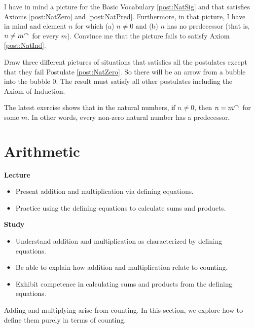 \begin{exer}
\begin{exercise}
\item\label{exer:cases} I have in mind a picture for the Basic Vocabulary \ref{post:NatSig} and that satisfies Axioms \ref{post:NatZero}
and \ref{post:NatPred}. Furthermore, in that picture, I have in mind and element $n$ for which (a) $n\neq 0$
and (b) $n$ has no predecessor (that is, $n\neq m^\curvearrowright$ for every $m$). Convince me that
the picture fails to satisfy Axiom \ref{post:NatInd}.
\item\label{exer:CyclicModel} Draw three different pictures of situations that satisfies all the postulates except that they fail Postulate \ref{post:NatZero}. So there will be an arrow from a bubble into the bubble $0$. The result must satisfy all other postulates including the Axiom of Induction.
\end{exercise}
\end{exer}

The latest exercise shows that in the natural numbers, if $n\neq 0$, then $n = m^\curvearrowright$ for some $m$. In other
words, every non-zero natural number has a predecessor. 


\chapter{Arithmetic}\label{lec:Arithmetic}


\begin{goals}
\tightlists
\noindent\textbf{Lecture}
\begin{itemize}
\item Present addition and multiplication via defining equations.
\item Practice using the defining equations to calculate sums and products.
\end{itemize}

\noindent\textbf{Study}
\begin{itemize}
  \item Understand addition and multiplication as characterized by defining equations.
  \item Be able to explain how addition and multiplication relate to counting.
  \item Exhibit competence in calculating sums and products from the defining equations.
\end{itemize}
\end{goals}

Adding and multiplying arise from counting. In this section, we explore how to define them purely in terms of counting.

